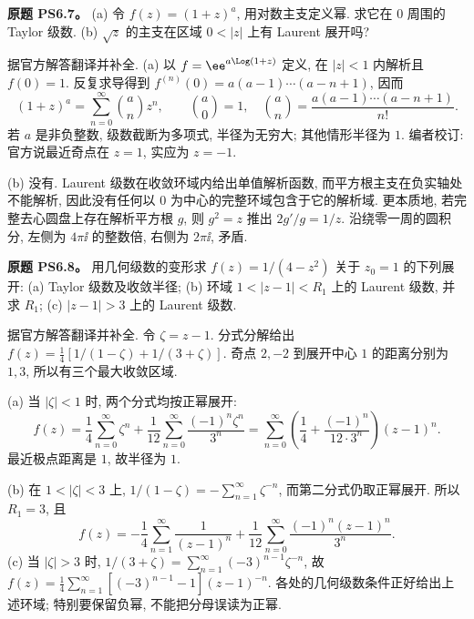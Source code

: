 \begin{exercise}
\textbf{原题 PS6.7。}\label{ass:ps6-7}
(a) 令 $f(z)=(1+z)^a$, 用对数主支定义幂. 求它在 $0$ 周围的 Taylor 级数.
(b) $\sqrt z$ 的主支在区域 $0<|z|$ 上有 Laurent 展开吗?
\end{exercise}
\begin{solution}
据官方解答翻译并补全.
(a) 以 $f=\ee^{a\Log(1+z)}$ 定义, 在 $|z|<1$ 内解析且 $f(0)=1$. 反复求导得到 $f^{(n)}(0)=a(a-1)\cdots(a-n+1)$, 因而
\[
 (1+z)^a=\sum_{n=0}^\infty\binom an z^n,
 \qquad \binom a0=1,\quad \binom an=\frac{a(a-1)\cdots(a-n+1)}{n!}.
\]
若 $a$ 是非负整数, 级数截断为多项式, 半径为无穷大; 其他情形半径为 $1$. 编者校订: 官方说最近奇点在 $z=1$, 实应为 $z=-1$.

(b) 没有. Laurent 级数在收敛环域内给出单值解析函数, 而平方根主支在负实轴处不能解析, 因此没有任何以 $0$ 为中心的完整环域包含于它的解析域. 更本质地, 若完整去心圆盘上存在解析平方根 $g$, 则 $g^2=z$ 推出 $2g'/g=1/z$. 沿绕零一周的圆积分, 左侧为 $4\pi\ii$ 的整数倍, 右侧为 $2\pi\ii$, 矛盾.
\end{solution}

\begin{exercise}
\textbf{原题 PS6.8。}\label{ass:ps6-8}
用几何级数的变形求 $f(z)=1/(4-z^2)$ 关于 $z_0=1$ 的下列展开:
(a) Taylor 级数及收敛半径;
(b) 环域 $1<|z-1|<R_1$ 上的 Laurent 级数, 并求 $R_1$;
(c) $|z-1|>3$ 上的 Laurent 级数.
\end{exercise}
\begin{solution}
据官方解答翻译并补全. 令 $\zeta=z-1$. 分式分解给出
$f(z)=\tfrac14[1/(1-\zeta)+1/(3+\zeta)]$.
奇点 $2,-2$ 到展开中心 $1$ 的距离分别为 $1,3$, 所以有三个最大收敛区域.
\begin{center}
\end{center}
(a) 当 $|\zeta|<1$ 时, 两个分式均按正幂展开:
\[
 f(z)=\frac14\sum_{n=0}^\infty\zeta^n+
 \frac1{12}\sum_{n=0}^\infty\frac{(-1)^n\zeta^n}{3^n}
 =\sum_{n=0}^\infty\left(\frac14+\frac{(-1)^n}{12\cdot3^n}\right)(z-1)^n.
\]
最近极点距离是 $1$, 故半径为 $1$.

(b) 在 $1<|\zeta|<3$ 上, $1/(1-\zeta)=-\sum_{n=1}^\infty\zeta^{-n}$, 而第二分式仍取正幂展开. 所以 $R_1=3$, 且
\[
 f(z)=-\frac14\sum_{n=1}^\infty\frac1{(z-1)^n}
 +\frac1{12}\sum_{n=0}^\infty\frac{(-1)^n(z-1)^n}{3^n}.
\]
(c) 当 $|\zeta|>3$ 时, $1/(3+\zeta)=\sum_{n=1}^\infty(-3)^{n-1}\zeta^{-n}$, 故
$f(z)=\tfrac14\sum_{n=1}^\infty[(-3)^{n-1}-1](z-1)^{-n}$.
各处的几何级数条件正好给出上述环域; 特别要保留负幂, 不能把分母误读为正幂.
\end{solution}

